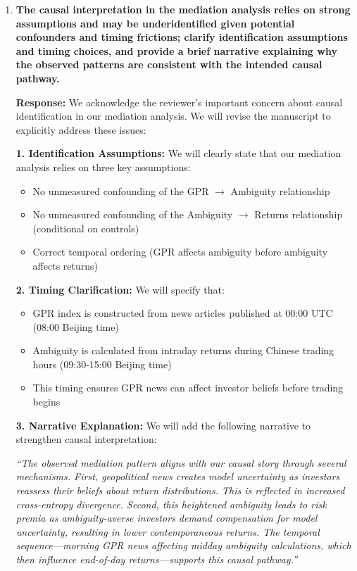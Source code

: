 \documentclass[12pt]{article}
\begin{document}
\begin{enumerate}
    \item \textbf{The causal interpretation in the mediation analysis relies on strong assumptions and may be underidentified given potential confounders and timing frictions; clarify identification assumptions and timing choices, and provide a brief narrative explaining why the observed patterns are consistent with the intended causal pathway.}

    \begin{responsebox}
    \textbf{Response:} We acknowledge the reviewer's important concern about causal identification in our mediation analysis. We will revise the manuscript to explicitly address these issues:
    \vspace{0.5cm}

    \textbf{1. Identification Assumptions:}
    We will clearly state that our mediation analysis relies on three key assumptions:
    \begin{itemize}
        \item No unmeasured confounding of the GPR $\rightarrow$ Ambiguity relationship
        \item No unmeasured confounding of the Ambiguity $\rightarrow$ Returns relationship (conditional on controls)
        \item Correct temporal ordering (GPR affects ambiguity before ambiguity affects returns)
    \end{itemize}

    \textbf{2. Timing Clarification:}
    We will specify that:
    \begin{itemize}
        \item GPR index is constructed from news articles published at 00:00 UTC (08:00 Beijing time)
        \item Ambiguity is calculated from intraday returns during Chinese trading hours (09:30-15:00 Beijing time)
        \item This timing ensures GPR news can affect investor beliefs before trading begins
    \end{itemize}

    \textbf{3. Narrative Explanation:}
    We will add the following narrative to strengthen causal interpretation:
    \vspace{0.5cm}


    \textit{``The observed mediation pattern aligns with our causal story through several mechanisms. First, geopolitical news creates model uncertainty as investors reassess their beliefs about return distributions. This is reflected in increased cross-entropy divergence. Second, this heightened ambiguity leads to risk premia as ambiguity-averse investors demand compensation for model uncertainty, resulting in lower contemporaneous returns. The temporal sequence---morning GPR news affecting midday ambiguity calculations, which then influence end-of-day returns---supports this causal pathway.''}


\end{responsebox}
\end{enumerate}
\end{document}
